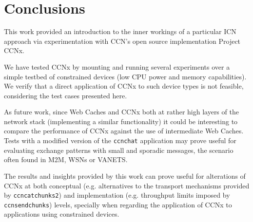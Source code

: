 \chapter{Conclusions}

This work provided an introduction to the inner workings of a particular ICN 
approach via experimentation with CCN's open source implementation Project 
CCNx.\vertbreak

We have tested CCNx by mounting and running several experiments over a simple 
testbed of constrained devices (low CPU power and memory capabilities). We 
verify that a direct application of CCNx to such device types is not feasible, 
considering the test cases presented here.\vertbreak

As future work, since Web Caches and CCNx both at rather high layers of the 
network stack (implementing a similar functionality) it could be interesting to 
compare the performance of CCNx against the use of intermediate Web Caches. 
Tests with a modified version of the \verb+ccnchat+ application may prove 
useful for evaluating exchange patterns with small and sporadic messages, the 
scenario often found in M2M, WSNs or VANETS.\vertbreak

The results and insights provided by this work can prove useful for alterations 
of CCNx at both conceptual (e.g. alternatives to the transport mechanisms 
provided by \verb+ccncatchunks2+) and implementation (e.g. throughput limits 
imposed by \verb+ccnsendchunks+) levels, specially when regarding the 
application of CCNx to applications using constrained devices.
